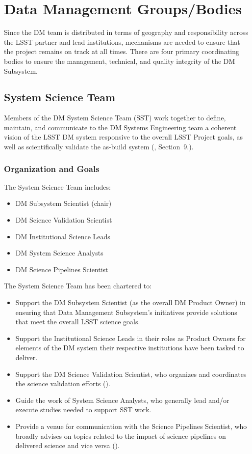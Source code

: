 \section{Data Management Groups/Bodies} \label{sect:groups}

Since the DM team is distributed in terms of geography and responsibility across the LSST partner and lead institutions, mechanisms are needed to ensure that the project remains on track at all times. There are four primary coordinating bodies to ensure the management, technical, and quality integrity of the DM Subsystem.

\subsection{System Science Team \label{sect:dmsst}}

Members of the DM System Science Team (SST) work together to define, maintain, and communicate to the DM Systems Engineering team a coherent vision of the LSST DM system responsive to the overall LSST Project goals, as well as scientifically validate the as-build system (, Section~9.).

\subsubsection{Organization and Goals}

The System Science Team includes:
\begin{itemize}
\item DM Subsystem Scientist (chair)
\item DM Science Validation Scientist
\item DM Institutional Science Leads
\item DM System Science Analysts
\item DM Science Pipelines Scientist
\end{itemize}

The System Science Team has been chartered to:
\begin{itemize}
\item Support the DM Subsystem Scientist (as the overall DM Product Owner) in ensuring that Data Management Subsystem's initiatives provide solutions that meet the overall LSST science goals.
\item Support the Institutional Science Leads in their roles as Product Owners for elements of the DM system their respective institutions have been tasked to deliver.
\item Support the DM Science Validation Scientist, who organizes and coordinates the science validation efforts ().
\item Guide the work of System Science Analysts, who generally lead and/or execute studies needed to support SST work.
\item Provide a venue for communication with the Science Pipelines Scientist, who broadly advises on topics related to the impact of science pipelines on delivered science and vice versa ().
\end{itemize}

